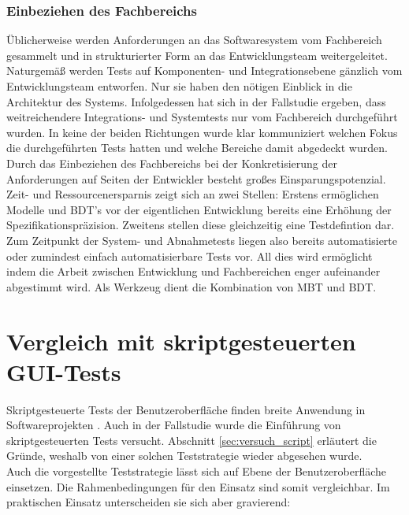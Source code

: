 \subsubsection{Einbeziehen des Fachbereichs}
Üblicherweise werden Anforderungen an das Softwaresystem vom Fachbereich gesammelt und in strukturierter Form an das Entwicklungsteam weitergeleitet. Naturgemäß werden Tests auf Komponenten- und Integrationsebene gänzlich vom Entwicklungsteam entworfen. Nur sie haben den nötigen Einblick in die Architektur des Systems. Infolgedessen hat sich in der Fallstudie ergeben, dass weitreichendere Integrations- und Systemtests nur vom Fachbereich durchgeführt wurden. In keine der beiden Richtungen wurde klar kommuniziert welchen Fokus die durchgeführten Tests hatten und welche Bereiche damit abgedeckt wurden. Durch das Einbeziehen des Fachbereichs bei der Konkretisierung der Anforderungen auf Seiten der Entwickler besteht großes Einsparungspotenzial. Zeit- und Ressourcenersparnis zeigt sich an zwei Stellen: Erstens ermöglichen Modelle und \Gls{BDT}'s vor der eigentlichen Entwicklung bereits eine Erhöhung der Spezifikationspräzision. Zweitens stellen diese gleichzeitig eine Testdefintion dar. Zum Zeitpunkt der System- und Abnahmetests liegen also bereits automatisierte oder zumindest einfach automatisierbare Tests vor. All dies wird ermöglicht indem die Arbeit zwischen Entwicklung und Fachbereichen enger aufeinander abgestimmt wird. Als Werkzeug dient die Kombination von \Gls{MBT} und \Gls{BDT}.

\section{Vergleich mit skriptgesteuerten GUI-Tests}
Skriptgesteuerte Tests der Benutzeroberfläche finden breite Anwendung in Softwareprojekten \cite{graham_experiences_2012}. Auch in der Fallstudie wurde die Einführung von skriptgesteuerten Tests versucht. Abschnitt \ref{sec:versuch_script} erläutert die Gründe, weshalb von einer solchen Teststrategie wieder abgesehen wurde.\\
Auch die vorgestellte Teststrategie lässt sich auf Ebene der Benutzeroberfläche einsetzen. Die Rahmenbedingungen für den Einsatz sind somit vergleichbar. Im praktischen Einsatz unterscheiden sie sich aber gravierend:

